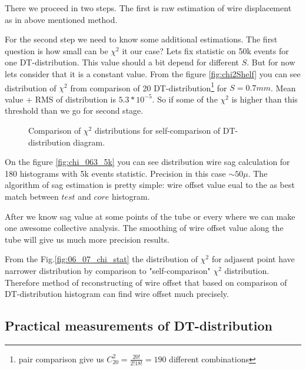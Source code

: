	There we proceed in two steps. The first is raw estimation of wire displacement as in above mentioned method.
	
	For the second step we need to know some additional estimations.	The first question is how small can be  $\chi^2$ it our case? Lets fix statistic on 50k events for one DT-distribution. This value should a bit depend for different $S$. But for now lets consider that it is a constant value. From the figure \ref{fig:chi2Shelf} you can see distribution of $\chi^2$ from comparison of 20 DT-distribution\footnote{pair comparison give us $C_{20}^2 = \frac{20!}{2!18!}=190$ different combinations}  for $S=0.7mm$. Mean value + RMS of distribution is $ 5.3*10^{-5}$. So if some of the $\chi^2$ is higher than this threshold than we go for second stage.
	
	
	\begin{figure}[h!]
		\centering
		\qquad
		\caption{Comparison of $\chi^2$ distributions for self-comparison of DT-distribution diagram.} 
	\end{figure}	
	
	On the figure \ref{fig:chi_063_5k} you can see distribution wire sag calculation for 180 histograms with 5k events statistic. Precision in this case  $\sim 50\mu$. The algorithm of sag estimation is pretty simple: wire offset value eual to the as best match between $test$ and $core$ histogram.

	After we know sag value at some points of the tube or every where we can make one awesome collective analysis. The smoothing of wire offset value along the tube will give us much more precision results.  
	
	From the Fig.\ref{fig:06_07_chi_stat} the distribution of $\chi^2$ for adjasent point have narrower distribution by comparison to "self-comparison" $\chi^2$ distribution. Therefore method of reconstructing of wire offset that based on comparison of DT-distribution histogram can find  wire offset much precisely.
	
	
	
	
	\subsection{Practical measurements of DT-distribution}
	
